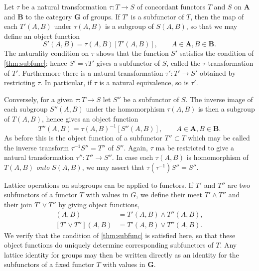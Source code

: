 \documentclass[11pt,a4paper]{report}
\begin{document}
Let $\tau$ be a natural transformation $\tau:T\rightarrow S$ of concordant functors $T$ and $S$ on $\mathbf{A}$ and $\mathbf{B}$
to the category $\mathbf{G}$ of groups. If $T'$ is a subfunctor of $T$, then the map of each $T'(A,B)$ under $\tau(A,B)$ is a
subgroup of $S(A,B)$, so that we may define an object function
\begin{equation*}
	S'(A,B)= \tau(A,B)[T'(A,B)],\qquad A\in\mathbf{A},B\in\mathbf{B}.
\end{equation*}
The naturality condition on $\tau$ shows that the function $S'$ satisfies the condition of \cref{thm:subfunc}; hence $S'=\tau T'$
gives a subfunctor of $S$, called the $\tau$-transformation of $T'$. Furthermore there is a natural transformation
$\tau':T'\rightarrow S'$ obtained by restricting $\tau$. In particular, if $\tau$ is a natural equivalence, so is $\tau'$.

Conversely, for a given $\tau:T\rightarrow S$ let $S''$ be a subfunctor of $S$. The inverse image of each subgroup $S''(A,B)$
under the homomorphism $\tau(A,B)$ is then a subgroup of $T(A,B)$, hence gives an object function
\begin{equation*}
	T''(A,B)=\tau{(A,B)}^{-1}[S''(A,B)],\qquad A\in\mathbf{A},B\in\mathbf{B}.
\end{equation*}
As before this is the object function of a subfunctor $T''\subset T$ which may be called the inverse transform
$\tau^{-1}S''=T''$ of $S''$. Again, $\tau$ ma be restricted to give a natural transformation $\tau'':T''\rightarrow S''$.
In case each $\tau(A,B)$ is homomorphism of $T(A,B)$ \emph{onto} $S(A,B)$, we may assert that $\tau(\tau^{-1}) S''=S''$.

Lattice operations on subgroups can be applied to functors. If $T'$ and $T''$ are two subfunctors of a functor $T$ with
values in $G$, we define their meet $T'\wedge T''$ and their join $T'\vee T''$ by giving object functions,
\begin{align*}
	[T'\wedge T''](A,B) & =  T'(A,B)\wedge T''(A,B),\\
	[T'\vee T''](A,B) & =  T'(A,B)\vee T''(A,B).
\end{align*}
We verify that the condition of \cref{thm:subfunc} is satisfied here, so that these object functions do uniquely determine
corresponding subfunctors of $T$. Any lattice identity for groups may then be written directly as an identity for the 
subfunctors of a fixed functor $T$ with values in $\mathbf{G}$.
\end{document}
